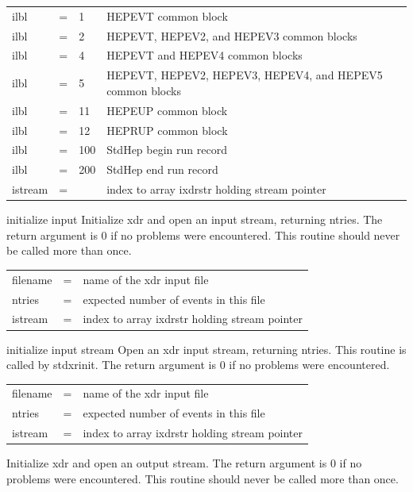 \begin{description}
\begin{tabular}{lcll}
ilbl & = & 1   & HEPEVT common block \\
ilbl & = & 2   & HEPEVT, HEPEV2, and HEPEV3 common blocks \\
ilbl & = & 4   & HEPEVT and HEPEV4 common blocks \\
ilbl & = & 5   & HEPEVT, HEPEV2, HEPEV3, HEPEV4, and HEPEV5 common blocks \\
ilbl & = & 11  & HEPEUP common block \\
ilbl & = & 12  & HEPRUP common block \\
ilbl & = & 100 & StdHep begin run record \\
ilbl & = & 200 & StdHep end run record \\
istream & = &  & index to array ixdrstr holding stream pointer \\
\end{tabular}

\item[int StdHepXdrReadInit(filename,ntries,istream)] initialize input
 Initialize xdr and open an input stream, returning ntries.
 The return argument is 0 if no problems were encountered.
 This routine should never be called more than once.

\begin{tabular}{lcl}
filename & = & name of the xdr input file \\
ntries & = & expected number of events in this file \\
istream & = & index to array ixdrstr holding stream pointer \\
\end{tabular}

\item[int StdHepXdrReadOpen(filename,ntries,istream)] initialize input stream
 Open an xdr input stream, returning ntries.
 This routine is called by stdxrinit.
 The return argument is 0 if no problems were encountered.

\begin{tabular}{lcl}
filename & = & name of the xdr input file \\
ntries & = & expected number of events in this file \\
istream & = & index to array ixdrstr holding stream pointer \\
\end{tabular}

\item[int StdHepXdrWriteInit(filename,title,ntries,istream)]
 Initialize xdr and open an output stream.
 The return argument is 0 if no problems were encountered.
 This routine should never be called more than once.


\end{description}
